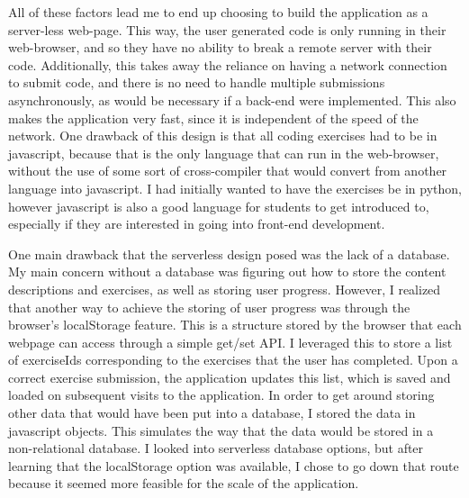 \documentclass[10pt,twocolumn]{article}
\begin{document}
All of these factors lead me to end up choosing to build the application as a server-less web-page. This way, the user generated 
code is only running in their web-browser, and so they have no ability to break a remote server with their code. Additionally, 
this takes away the reliance on having a network connection to submit code, and there is no need to handle multiple submissions 
asynchronously, as would be necessary if a back-end were implemented. This also makes the application very fast, since it is 
independent of the speed of the network. One drawback of this design is that all coding exercises had to be in javascript, 
because that is the only language that can run in the web-browser, without the use of some sort of cross-compiler that would 
convert from another language into javascript. I had initially wanted to have the exercises be in python, however javascript 
is also a good language for students to get introduced to, especially if they are interested in going into front-end development. 

One main drawback that the serverless design posed was the lack of a database. My main concern without a database was figuring
out how to store the content descriptions and exercises, as well as storing user progress. However, I realized that another 
way to achieve the storing of user progress was through the browser's localStorage feature. This is a structure stored by the 
browser that each webpage can access through a simple get/set API. I leveraged this to store a list of exerciseIds corresponding 
to the exercises that the user has completed. Upon a correct exercise submission, the application updates this list, which is 
saved and loaded on subsequent visits to the application. In order to get around storing other data that would have been put 
into a database, I stored the data in javascript objects. This simulates the way that the data would be stored in a non-relational
database. I looked into serverless database options, but after learning that the localStorage option was available, I chose to go 
down that route because it seemed more feasible for the scale of the application. 
\end{document}
